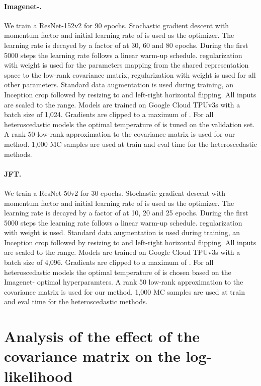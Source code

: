 \documentclass[final]{cvpr}
\begin{document}
\paragraph{Imagenet-.} We train a ResNet-152v2 \cite{he2016deep} for 90 epochs. Stochastic gradient descent with momentum factor  and initial learning rate of  is used as the optimizer. The learning rate is decayed by a factor of  at 30, 60 and 80 epochs. During the first 5000 steps the learning rate follows a linear warm-up schedule.  regularization with weight  is used for the parameters mapping from the shared representation space to the low-rank covariance matrix,  regularization with weight  is used for all other parameters. Standard data augmentation is used during training, an Inception crop followed by resizing to  and left-right horizontal flipping. All inputs are scaled to the  range. Models are trained on  Google Cloud TPUv3s with a batch size of 1,024. Gradients are clipped to a maximum  of . For all heteroscedastic models the optimal  temperature of  is tuned on the validation set. A rank 50 low-rank approximation to the covariance matrix is used for our method. 1,000 MC samples are used at train and eval time for the heteroscedastic methods.

\paragraph{JFT.} We train a ResNet-50v2 \cite{he2016deep} for 30 epochs. Stochastic gradient descent with momentum factor  and initial learning rate of  is used as the optimizer. The learning rate is decayed by a factor of  at 10, 20 and 25 epochs. During the first 5000 steps the learning rate follows a linear warm-up schedule.  regularization with weight  is used. Standard data augmentation is used during training, an Inception crop followed by resizing to  and left-right horizontal flipping. All inputs are scaled to the  range. Models are trained on  Google Cloud TPUv3s with a batch size of 4,096. Gradients are clipped to a maximum  of . For all heteroscedastic models the optimal  temperature of  is chosen based on the Imagenet- optimal hyperparamters. A rank 50 low-rank approximation to the covariance matrix is used for our method. 1,000 MC samples are used at train and eval time for the heteroscedastic methods.

\section{Analysis of the effect of the covariance matrix on the log-likelihood}
\label{app:correlations_effect}
\end{document}
